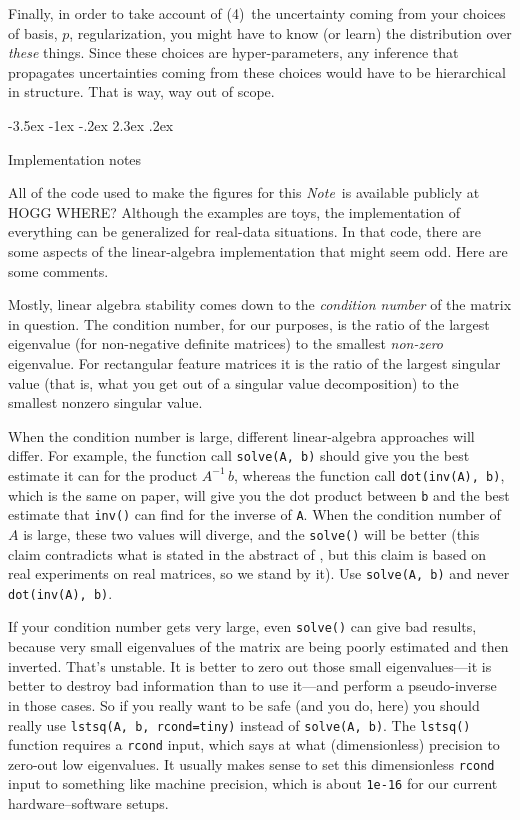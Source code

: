\documentclass[12pt,letterpaper]{article}
\makeatletter
\renewcommand\section{\@startsection {section}{1}{\z@}%
  {-3.5ex \@plus -1ex \@minus -.2ex}%
  {2.3ex \@plus.2ex}%
  {\raggedright\normalfont\Large\bfseries}}
\newcommand{\documentname}{\textsl{Note}}
\newcommand{\code}[1]{\texttt{#1}}
\makeatother
\begin{document}
Finally, in order to take account of (4)~the uncertainty coming from your choices of basis, $p$, regularization, you might have to know (or learn) the distribution over \emph{these} things.
Since these choices are hyper-parameters, any inference that propagates uncertainties coming from these choices would have to be hierarchical in structure.
That is way, way out of scope.

\section{Implementation notes}\label{sec:implementation}

All of the code used to make the figures for this \documentname\ is available publicly at HOGG WHERE?
Although the examples are toys, the implementation of everything can be generalized for real-data situations.
In that code, there are some aspects of the linear-algebra implementation that might seem odd.
Here are some comments.

Mostly, linear algebra stability comes down to the \emph{condition number} of the matrix in question.
The condition number, for our purposes, is the ratio of the largest eigenvalue (for non-negative definite matrices) to the smallest \emph{non-zero} eigenvalue.
For rectangular feature matrices it is the ratio of the largest singular value (that is, what you get out of a singular value decomposition) to the smallest nonzero singular value.

When the condition number is large, different linear-algebra approaches will differ.
For example, the function call \code{solve(A, b)} should give you the best estimate it can for the product $A^{-1}\,b$, whereas the function call \code{dot(inv(A), b)}, which is the same on paper, will give you the dot product between \code{b} and the best estimate that \code{inv()} can find for the inverse of \code{A}.
When the condition number of $A$ is large, these two values will diverge, and the \code{solve()} will be better (this claim contradicts what is stated in the abstract of \citealt{solve}, but this claim is based on real experiments on real matrices, so we stand by it).
Use \code{solve(A, b)} and never \code{dot(inv(A), b)}.

If your condition number gets very large, even \code{solve()} can give bad results, because very small eigenvalues of the matrix are being poorly estimated and then inverted.
That's unstable.
It is better to zero out those small eigenvalues---it is better to destroy bad information than to use it---and perform a pseudo-inverse in those cases.
So if you really want to be safe (and you do, here) you should really use \code{lstsq(A, b, rcond=tiny)} instead of \code{solve(A, b)}.
The \code{lstsq()} function requires a \code{rcond} input, which says at what (dimensionless) precision to zero-out low eigenvalues.
It usually makes sense to set this dimensionless \code{rcond} input to something like machine precision, which is about \code{1e-16} for our current hardware--software setups.
\end{document}
